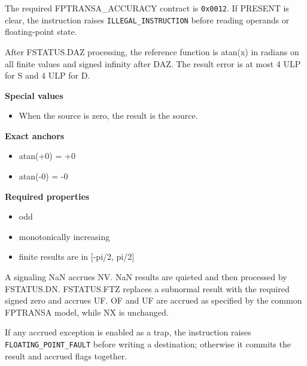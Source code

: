 The required FPTRANSA\_ACCURACY contract is \texttt{0x0012}. If PRESENT is clear, the instruction raises \texttt{ILLEGAL\_INSTRUCTION} before reading operands or floating-point state.

After FSTATUS.DAZ processing, the reference function is atan(x) in radians on all finite values and signed infinity after DAZ. The result error is at most 4 ULP for S and 4 ULP for D.

\textbf{Special values}\par
\begin{itemize}
\item When the source is zero, the result is the source.
\end{itemize}

\textbf{Exact anchors}\par
\begin{itemize}
\item atan(+0) = +0
\item atan(-0) = -0
\end{itemize}

\textbf{Required properties}\par
\begin{itemize}
\item odd
\item monotonically increasing
\item finite results are in [-pi/2, pi/2]
\end{itemize}

A signaling NaN accrues NV. NaN results are quieted and then processed by FSTATUS.DN. FSTATUS.FTZ replaces a subnormal result with the required signed zero and accrues UF. OF and UF are accrued as specified by the common FPTRANSA model, while NX is unchanged.

If any accrued exception is enabled as a trap, the instruction raises \texttt{FLOATING\_POINT\_FAULT} before writing a destination; otherwise it commits the result and accrued flags together.

